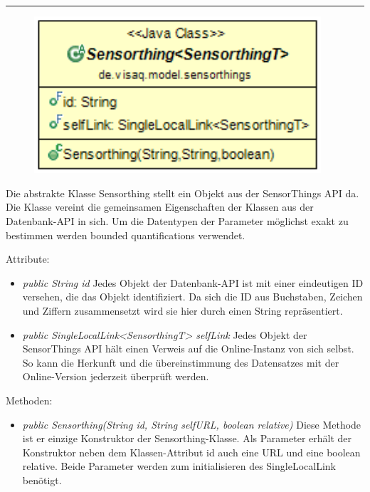 \rule{\textwidth}{0.4pt}
\begin{minipage}{0.4\textwidth}
    \begin{figure}[H]
        {\centering\includegraphics[width=0.95\textwidth]{media/backend/modell/classes/Sensorthing.png}}
    \end{figure}
    \end{minipage} \hfill
    \begin{minipage}{0.6\textwidth}
Die abstrakte Klasse Sensorthing stellt ein Objekt aus der \gls{SensorThings API} da.
Die Klasse vereint die gemeinsamen Eigenschaften der Klassen aus der Datenbank-\gls{API} in sich.
Um die Datentypen der Parameter möglichst exakt zu bestimmen werden \glspl{bounded quantification} verwendet.
\end{minipage}

Attribute:
\begin{itemize}
    \item \emph{public String id} Jedes Objekt der Datenbank-\gls{API} ist mit einer eindeutigen ID versehen, die das Objekt identifiziert.
    Da sich die ID aus Buchstaben, Zeichen und Ziffern zusammensetzt wird sie hier durch einen String repräsentiert.
    \item \emph{public SingleLocalLink<SensorthingT> selfLink} Jedes Objekt der \gls{SensorThings API} hält einen Verweis auf die Online-Instanz von sich selbst.
    So kann die Herkunft und die übereinstimmung des Datensatzes mit der Online-Version jederzeit überprüft werden.
\end{itemize}
Methoden: \begin{itemize}
    \item \emph{public Sensorthing(String id, String selfURL, boolean relative)} Diese Methode ist er einzige Konstruktor der Sensorthing-Klasse.
    Als Parameter erhält der Konstruktor neben dem Klassen-Attribut id auch eine URL und eine boolean relative. Beide Parameter werden zum initialisieren des SingleLocalLink benötigt.
\end{itemize}

